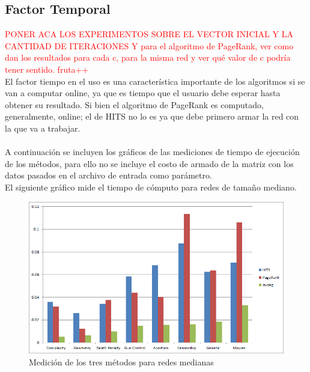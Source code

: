 \documentclass[a4paper]{article}
\begin{document}
\subsection{Factor Temporal}
\textcolor{red}{PONER ACA LOS EXPERIMENTOS SOBRE EL VECTOR INICIAL Y LA CANTIDAD DE ITERACIONES
Y para el algoritmo de PageRank, ver como dan los resultados para cada c, para la misma red y ver qué valor de c podría tener sentido. fruta++ }
\\
\indent El factor tiempo en el uso es una caracter\'istica importante de los algoritmos si se van a computar online, ya que es tiempo que el usuario debe esperar hasta obtener su resultado. Si bien el algoritmo de PageRank es computado, generalmente, online; el de HITS no lo es ya que debe primero armar la red con la que va a trabajar.\\
\\
\indent A continuaci\'on se incluyen los gr\'aficos de las mediciones de tiempo de ejecuci\'on de los m\'etodos, para ello no se incluye el costo de armado de la matriz con los datos pasados en el archivo de entrada como par\'ametro.\\
El siguiente gr\'afico mide el tiempo de c\'omputo para redes de tama\~no mediano.

\begin{figure}[h!]
  \begin{center}
	\includegraphics[scale=0.50]{imagenes/expTiempo/tiemposMedianos.png}
	\caption{Medici\'on de los tres m\'etodos para redes medianas}
	\label{nombreparareferenciar}
  \end{center}
\end{figure}
\end{document}
